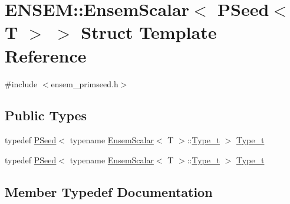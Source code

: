 \hypertarget{structENSEM_1_1EnsemScalar_3_01PSeed_3_01T_01_4_01_4}{}\section{E\+N\+S\+EM\+:\+:Ensem\+Scalar$<$ P\+Seed$<$ T $>$ $>$ Struct Template Reference}
\label{structENSEM_1_1EnsemScalar_3_01PSeed_3_01T_01_4_01_4}


{\ttfamily \#include $<$ensem\+\_\+primseed.\+h$>$}

\subsection*{Public Types}
\begin{DoxyCompactItemize}
\item 
typedef \mbox{\hyperlink{classENSEM_1_1PSeed}{P\+Seed}}$<$ typename \mbox{\hyperlink{structENSEM_1_1EnsemScalar}{Ensem\+Scalar}}$<$ T $>$\+::\mbox{\hyperlink{structENSEM_1_1EnsemScalar_3_01PSeed_3_01T_01_4_01_4_abb7f97324ea0068fcbf50343784cd95c}{Type\+\_\+t}} $>$ \mbox{\hyperlink{structENSEM_1_1EnsemScalar_3_01PSeed_3_01T_01_4_01_4_abb7f97324ea0068fcbf50343784cd95c}{Type\+\_\+t}}
\item 
typedef \mbox{\hyperlink{classENSEM_1_1PSeed}{P\+Seed}}$<$ typename \mbox{\hyperlink{structENSEM_1_1EnsemScalar}{Ensem\+Scalar}}$<$ T $>$\+::\mbox{\hyperlink{structENSEM_1_1EnsemScalar_3_01PSeed_3_01T_01_4_01_4_abb7f97324ea0068fcbf50343784cd95c}{Type\+\_\+t}} $>$ \mbox{\hyperlink{structENSEM_1_1EnsemScalar_3_01PSeed_3_01T_01_4_01_4_abb7f97324ea0068fcbf50343784cd95c}{Type\+\_\+t}}
\end{DoxyCompactItemize}


\subsection{Member Typedef Documentation}
\mbox{\label{structENSEM_1_1EnsemScalar_3_01PSeed_3_01T_01_4_01_4_abb7f97324ea0068fcbf50343784cd95c}} 
